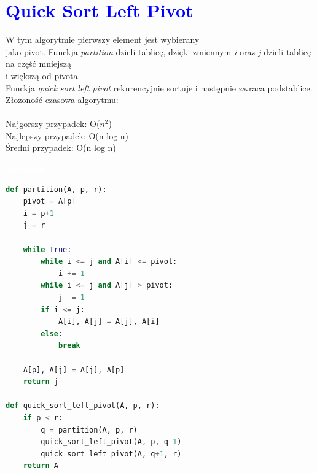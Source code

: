 \documentclass{article}
\begin{document}
	\newpage
	
	\section*{\textcolor{blue}{Quick Sort Left Pivot}}
	\begin{multicols}{2}
		\noindent W tym algorytmie pierwszy element jest wybierany \\jako pivot. Funckja \textit{partition} dzieli tablicę, dzięki zmiennym \textit{i} oraz \textit{j} dzieli tablicę na część mniejszą \\i większą od pivota. \\Funckja \textit{quick sort left pivot} rekurencyjnie sortuje i następnie zwraca podstablice.\\
		Złożoność czasowa algorytmu: \\ \\Najgorszy przypadek: O($n^2$) \\Najlepszy przypadek: O(n log n) \\ Średni przypadek: O(n log n)
		
		\noindent 
		\begin{tcolorbox}[colback=black,colframe=gray!50!,arc=3mm,boxrule=0pt,left=0pt,right=0pt,width=\linewidth]
			\textcolor{white}{\textbf{\textsf{Terminal}}}\\
			
			\begin{lstlisting}[language=Python]
def partition(A, p, r):
	pivot = A[p]
	i = p+1
	j = r

	while True:
		while i <= j and A[i] <= pivot:
			i += 1
		while i <= j and A[j] > pivot:
			j -= 1
		if i <= j:
			A[i], A[j] = A[j], A[i]
		else:
			break

	A[p], A[j] = A[j], A[p]
	return j

def quick_sort_left_pivot(A, p, r):
	if p < r:
		q = partition(A, p, r)
		quick_sort_left_pivot(A, p, q-1)
		quick_sort_left_pivot(A, q+1, r)
	return A
			\end{lstlisting}
			
		\end{tcolorbox}
	\end{multicols}
	
	\newpage
	
\end{document}
